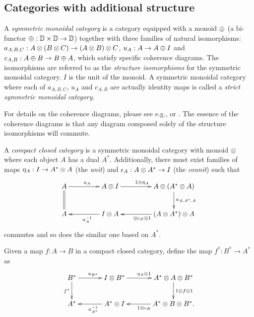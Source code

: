 \subsection{Categories with additional structure} %
\label{sub:categories_with_additional_structure}

\begin{definition}\label{symmetricmonoidalcat}
  A \emph{symmetric monoidal category} \cD{} is a category equipped with a monoid $\oplus$ (a bi-functor
  $\oplus:\mathbb{D} \times \mathbb{D} \to \mathbb{D}$) together with three families of natural isomorphisms:
  $a_{A,B,C}:A\otimes(B\otimes C) \to (A\otimes B)\otimes C$, $u_{A}:A\to A\oplus I$ and $c_{A,B}:A\oplus B \to B\oplus A$, which satisfy
  specific coherence diagrams. The isomorphisms are referred to as the \emph{structure isomorphisms}
  for the symmetric monoidal category. $I$ is the unit of the monoid.
  A symmetric monoidal category where each of $a_{A,B,C}$, $u_{A}$ and $c_{A,B}$ are actually
  identity maps is called a \emph{strict symmetric monoidal category}.
\end{definition}
For details on the coherence diagrams, please see e.g., \cite{barr:ctcs} or
\cite{maclan97:categorieswrkmath}. The essence of the coherence diagrams is that any diagram
composed solely of the structure isomorphisms will commute.

\begin{definition}\label{def:compactclosedcat}
A \emph{compact closed category} \cD{} is a symmetric monoidal category with monoid $\otimes$ where each
object $A$ has a dual $A^{*}$. Additionally, there must exist families of maps $\eta_{A}: I \to
A^{*} \otimes A$ (the \emph{unit}) and $\epsilon_{A}: A\otimes A^{*}\to I$ (the \emph{counit}) such that
\[
  \xymatrix@C+20pt{
    A \ar[r]^{u_{A}} \ar@{=}[d]  & A\*I \ar[r]^{1\*\eta_{A}}
        & A\* (A^{*}\*A) \ar[d]^{a_{A,A^{*},A}} \\
    A & I\* A \ar[l]^{u_{A}^{-1}} & (A\* A^{*})\*A \ar[l]^{\*\epsilon_{B}\*1}
    }
  \]
commutes and so does the similar one based on $A^{*}$.
\end{definition}

Given a map $f:A\to B$ in a compact closed category,  define the map $f^{*}:B^{*} \to A^{*}$ as
\[
  \xymatrix@C+10pt{
    B^{*}\ar[r]^{u_{B^{*}}} \ar[d]_{f^{*}}& I\*B^{*} \ar[r]^{\eta_{A}\*1}
      & A^{*}\*A\*B^{*}\ar[d]^{1\*f\*1}\\
    A^{*}&    A^{*}\*I\ar[l]^{u_{A^{*}}^{-1}}  &   A^{*}\*B\*B^{*}\ar[l]^{1\*\epsilon_{B}}.
  }
\]



